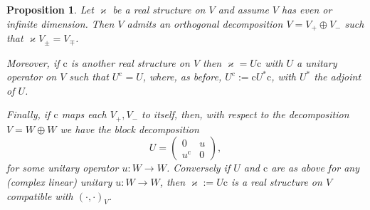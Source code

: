 \documentclass{article}
\newcommand{\assign}{:=}
\newcommand{\cdummy}{\cdot}
\newtheorem{proposition}[theorem]{Proposition}
{\theorembodyfont{\rmfamily}\newtheorem{remark}[theorem]{Remark}}
\begin{document}
\begin{proposition}
  \label{GPpro:orthogonal-dec}Let $\varkappa$ be a real structure on $V$ and
  assume $V$ has even or infinite dimension. Then $V$ admits an orthogonal
  decomposition $V = V_+ \oplus V_-$ such that $\varkappa V_{\pm} = V_{\mp}$.
  
  Moreover, if $\mathrm{c}$ is another real structure on $V$ then $\varkappa =
  U\mathrm{c}$ with $U$ a unitary operator on $V$ such that $U^{\mathrm{c}} =
  U$, where, as before, $U^{\mathrm{c}} \assign \mathrm{c}U^{\ast}
  \mathrm{c}$, with $U^{\ast}$ the adjoint of $U$.
  
  Finally, if $\mathrm{c}$ maps each $V_+, V_-$ to itself, then, with respect
  to the decomposition $V = W \oplus W$ we have the block decomposition
  \begin{equation}
    U = \left( \begin{array}{cc}
      0 & u\\
      u^{\mathrm{c}} & 0
    \end{array} \right) \label{GPeq:UsDecomposition},
  \end{equation}
  for some unitary operator $u : W \rightarrow W$. Conversely if $U$ and
  $\mathrm{c}$ are as above for any (complex linear) unitary $u : W
  \rightarrow W$, then $\varkappa \assign U\mathrm{c}$ is a real structure on
  $V$ compatible with $(\cdummy, \cdummy)_V$.
\end{proposition}
\end{document}
